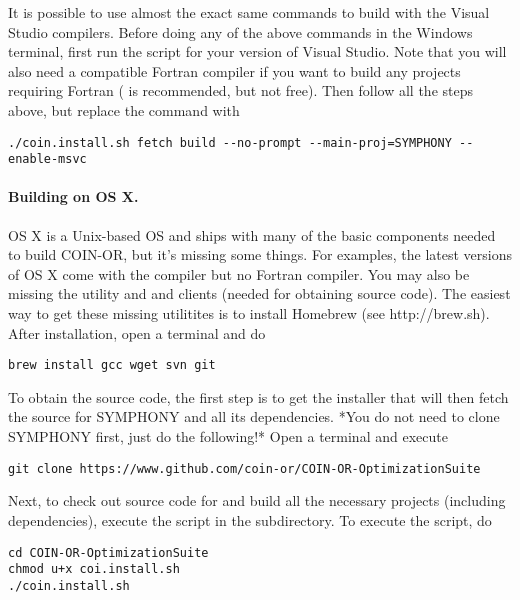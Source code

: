 It is possible to use almost the exact same commands to build with the Visual
Studio compilers. Before doing any of the above commands in the Windows
terminal, first run the  script for your version of Visual
Studio. Note that you will also need a compatible Fortran compiler if you want
to build any projects requiring Fortran ( is recommended, but not
free). Then follow all the steps above, but replace the  command
with

{\color{Brown}
\begin{verbatim}
./coin.install.sh fetch build --no-prompt --main-proj=SYMPHONY --enable-msvc
\end{verbatim}
}

\paragraph{Building on OS X.}

OS X is a Unix-based OS and ships with many of the basic components needed to
build COIN-OR, but it's missing some things. For examples, the latest versions
of OS X come with the  compiler but no Fortran compiler. You may also
be missing the  utility and  and  clients (needed for
obtaining source code). The easiest way to get these missing utilitites is to
install Homebrew (see http://brew.sh). After installation, open a terminal and
do

{\color{Brown}
\begin{verbatim}
brew install gcc wget svn git
\end{verbatim}
}

To obtain the source code, the first step is to get the installer that will then
fetch the source for SYMPHONY and all its dependencies. *You do not need to
clone SYMPHONY first, just do the following!* Open a terminal and execute

{\color{Brown}
\begin{verbatim}
git clone https://www.github.com/coin-or/COIN-OR-OptimizationSuite
\end{verbatim}
}

Next, to check out source code for and build all the necessary projects
(including dependencies), execute the script in the 
subdirectory. To execute the script, do

{\color{Brown}
\begin{verbatim}
cd COIN-OR-OptimizationSuite
chmod u+x coi.install.sh
./coin.install.sh
\end{verbatim}
}

